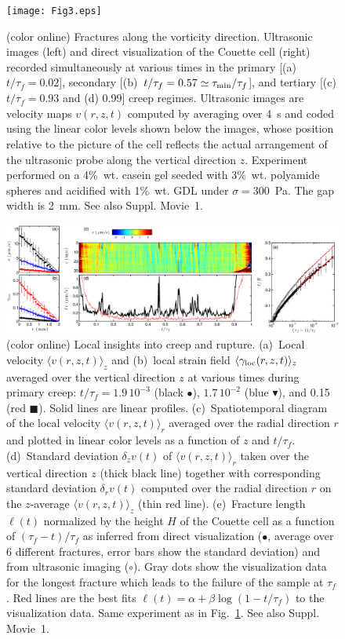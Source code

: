 \documentclass[twocolumn,superscriptaddress,showpacs,preprintnumbers,amsmath,amssymb,prl]{revtex4}
\newcommand\gl{\gamma_{\rm loc}}
\newcommand\taum{\tau_{\rm min}}
\begin{document}
\begin{figure}
\centering
\texttt{[image: Fig3.eps]}
\caption{(color online) Fractures along the vorticity direction. Ultrasonic images (left) and direct visualization of the Couette cell (right) recorded simultaneously at various times in the primary [(a)~$t/\tau_f=0.02$], secondary [(b)~$t/\tau_f=0.57\simeq\taum/\tau_f$], and tertiary  [(c) $t/\tau_f=0.93$ and (d) 0.99] creep regimes. Ultrasonic images are velocity maps $v(r,z,t)$ computed by averaging over 4~s and coded using the linear color levels shown below the images, whose position relative to the picture of the cell reflects the actual arrangement of the ultrasonic probe along the vertical direction $z$. Experiment performed on a 4\%~wt. casein gel seeded with 3\%~wt. polyamide spheres and acidified with 1\%~wt. GDL under $\sigma=300$~Pa. The gap width is 2~mm. See also Suppl. Movie~1.
\label{fig3}}
\end{figure} 

\begin{figure}
\centering
\includegraphics[width=18cm,clip]{Fig4.eps}
\caption{(color online) Local insights into creep and rupture. (a)~Local velocity $\langle v(r,z,t)\rangle_z$ and (b)~local strain field $\langle\gl(r,z,t)\rangle_z$ averaged over the vertical direction $z$ at various times during primary creep: $t/\tau_f=1.9\,10^{-3}$ (black $\bullet$), $1.7\,10^{-2}$ (blue $\blacktriangledown$), and 0.15 (red $\blacksquare$). Solid lines are linear profiles. (c)~Spatiotemporal diagram of the local velocity $\langle v(r,z,t)\rangle_r$ averaged over the radial direction $r$ and plotted in linear color levels as a function of $z$ and $t/\tau_f$. (d)~Standard deviation $\delta_z v(t)$ of $\langle v(r,z,t)\rangle_r$ taken over the vertical direction $z$ (thick black line) together with corresponding standard deviation $\delta_r v(t)$ computed over the radial direction $r$ on the $z$-average $\langle v(r,z,t)\rangle_z$ (thin red line). (e)~Fracture length $\ell(t)$ normalized by the height $H$ of the Couette cell as a function of $(\tau_f-t)/\tau_f$ as inferred from direct visualization ($\bullet$, average over 6 different fractures, error bars show the standard deviation) and from ultrasonic imaging ($\circ$). Gray dots show the visualization data for the longest fracture which leads to the failure of the sample at $\tau_f$. Red lines are the best fits $\ell(t)=\alpha+\beta\log(1-t/\tau_f)$ to the visualization data. Same experiment as in Fig.~\ref{fig3}. See also Suppl. Movie~1.
\label{fig4}}
\end{figure} 
\end{document}
